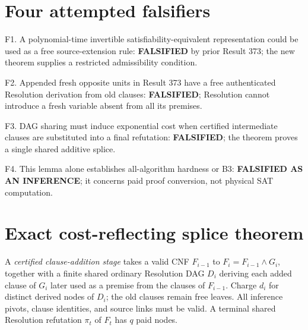 \documentclass[11pt]{article}
\begin{document}
\section*{Four attempted falsifiers}
\noindent F1. A polynomial-time invertible satisfiability-equivalent representation could be used as a free source-extension rule: \textbf{FALSIFIED} by prior Result 373; the new theorem supplies a restricted admissibility condition.

\noindent F2. Appended fresh opposite units in Result 373 have a free authenticated Resolution derivation from old clauses: \textbf{FALSIFIED}; Resolution cannot introduce a fresh variable absent from all its premises.

\noindent F3. DAG sharing must induce exponential cost when certified intermediate clauses are substituted into a final refutation: \textbf{FALSIFIED}; the theorem proves a single shared additive splice.

\noindent F4. This lemma alone establishes all-algorithm hardness or B3: \textbf{FALSIFIED AS AN INFERENCE}; it concerns paid proof conversion, not physical SAT computation.

\section*{Exact cost-reflecting splice theorem}
A \emph{certified clause-addition stage} takes a valid CNF $F_{i-1}$ to $F_i=F_{i-1}\wedge G_i$, together with a finite shared ordinary Resolution DAG $D_i$ deriving each added clause of $G_i$ later used as a premise from the clauses of $F_{i-1}$. Charge $d_i$ for distinct derived nodes of $D_i$; the old clauses remain free leaves. All inference pivots, clause identities, and source links must be valid. A terminal shared Resolution refutation $\pi_t$ of $F_t$ has $q$ paid nodes.
\end{document}
